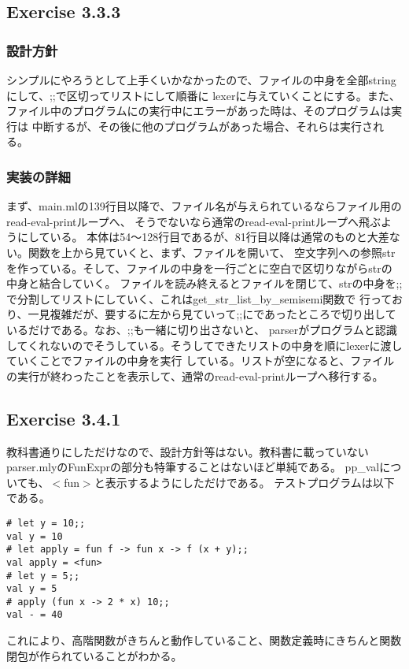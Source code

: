 \documentclass{jarticle}
\begin{document}
\subsection{Exercise 3.3.3}
\subsubsection{設計方針}
シンプルにやろうとして上手くいかなかったので、ファイルの中身を全部stringにして、;;で区切ってリストにして順番に
lexerに与えていくことにする。また、ファイル中のプログラムにの実行中にエラーがあった時は、そのプログラムは実行は
中断するが、その後に他のプログラムがあった場合、それらは実行される。
\subsubsection{実装の詳細}
まず、main.mlの139行目以降で、ファイル名が与えられているならファイル用のread-eval-printループへ、
そうでないなら通常のread-eval-printループへ飛ぶようにしている。
本体は54〜128行目であるが、81行目以降は通常のものと大差ない。関数を上から見ていくと、まず、ファイルを開いて、
空文字列への参照strを作っている。そして、ファイルの中身を一行ごとに空白で区切りながらstrの中身と結合していく。
ファイルを読み終えるとファイルを閉じて、strの中身を;;で分割してリストにしていく、これはget\_str\_list\_by\_semisemi関数で
行っており、一見複雑だが、要するに左から見ていって;;にであったところで切り出しているだけである。なお、;;も一緒に切り出さないと、
parserがプログラムと認識してくれないのでそうしている。そうしてできたリストの中身を順にlexerに渡していくことでファイルの中身を実行
している。リストが空になると、ファイルの実行が終わったことを表示して、通常のread-eval-printループへ移行する。

\subsection{Exercise 3.4.1}
教科書通りにしただけなので、設計方針等はない。教科書に載っていないparser.mlyのFunExprの部分も特筆することはないほど単純である。
pp\_valについても、$<$fun$>$と表示するようにしただけである。
テストプログラムは以下である。
\begin{lstlisting}[basicstyle=\ttfamily\footnotesize, frame=single]
# let y = 10;;
val y = 10
# let apply = fun f -> fun x -> f (x + y);;
val apply = <fun>
# let y = 5;;
val y = 5
# apply (fun x -> 2 * x) 10;;
val - = 40
\end{lstlisting}
これにより、高階関数がきちんと動作していること、関数定義時にきちんと関数閉包が作られていることがわかる。
\end{document}
